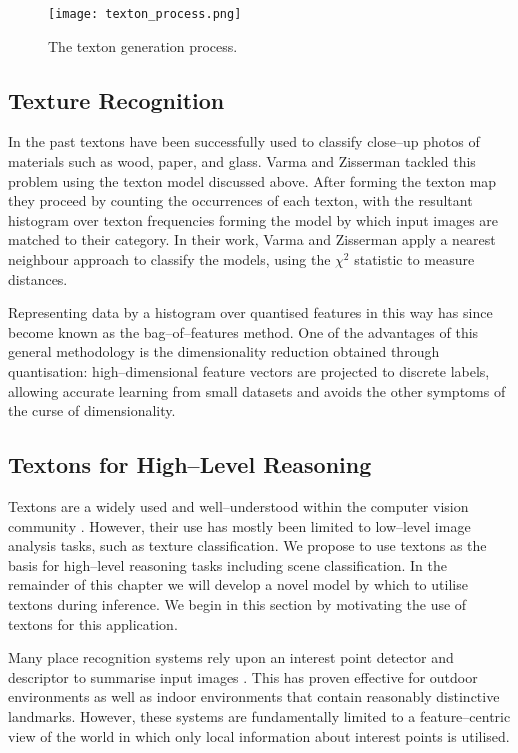 \begin{figure}[htp]
  \centering
  \texttt{[image: texton\_process.png]}
  \caption{The texton generation process.}
  \label{fig:texton-process}
\end{figure}

\subsection{Texture Recognition}
In the past textons have been successfully used to classify close--up
photos of materials such as wood, paper, and glass. Varma and
Zisserman \cite{Varma05} tackled this problem using the texton model
discussed above. After forming the texton map they proceed by counting
the occurrences of each texton, with the resultant histogram over
texton frequencies forming the model by which input images are matched
to their category. In their work, Varma and Zisserman apply a nearest
neighbour approach to classify the models, using the $\chi^2$
statistic to measure distances.

Representing data by a histogram over quantised features in this way
has since become known as the bag--of--features method. One of the
advantages of this general methodology is the dimensionality reduction
obtained through quantisation: high--dimensional feature vectors are
projected to discrete labels, allowing accurate learning from small
datasets and avoids the other symptoms of the curse of dimensionality.

\subsection{Textons for High--Level Reasoning}
Textons are a widely used and well--understood within the computer
vision community \cite{Zhu02,Varma05,Malik99}. However, their use has
mostly been limited to low--level image analysis tasks, such as
texture classification. We propose to use textons as the basis for
high--level reasoning tasks including scene classification. In the
remainder of this chapter we will develop a novel model by which to
utilise textons during inference. We begin in this section by
motivating the use of textons for this application.

Many place recognition systems rely upon an interest point detector
and descriptor to summarise input images
\cite{Fei-fei05,Cummins08}. This has proven effective for outdoor
environments as well as indoor environments that contain reasonably
distinctive landmarks. However, these systems are fundamentally
limited to a feature--centric view of the world in which only local
information about interest points is utilised.

